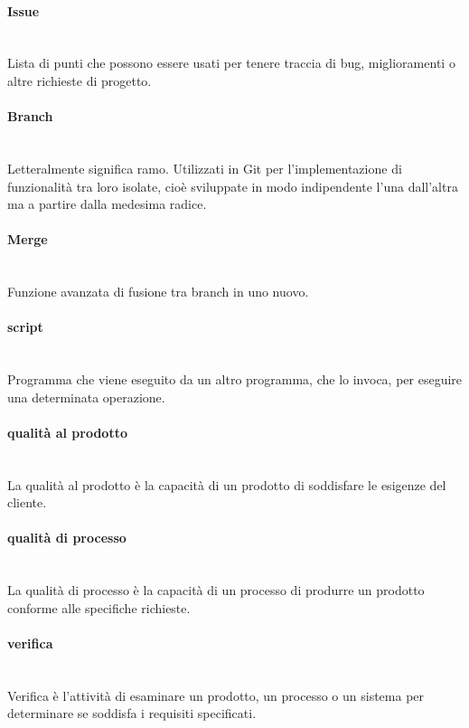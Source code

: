 \paragraph{Issue}~\smallskip \\
Lista di punti che possono essere usati per tenere traccia di bug, miglioramenti o altre richieste di progetto.

\paragraph{Branch}~\smallskip \\
Letteralmente significa ramo. Utilizzati in Git per l'implementazione di funzionalità tra loro isolate, cioè sviluppate in modo indipendente l'una dall'altra ma a partire dalla medesima radice.

\paragraph{Merge}~\smallskip \\
Funzione avanzata di fusione tra branch in uno nuovo.

\paragraph{script}~\smallskip \\
Programma che viene eseguito da un altro programma, che lo invoca, per eseguire una determinata operazione.

\paragraph{qualità al prodotto}~\smallskip \\
La qualità al prodotto è la capacità di un prodotto di soddisfare le esigenze del cliente.

\paragraph{qualità di processo}~\smallskip \\
La qualità di processo è la capacità di un processo di produrre un prodotto conforme alle specifiche richieste.

\paragraph{verifica}~\smallskip \\
Verifica è l'attività di esaminare un prodotto, un processo o un sistema per determinare se soddisfa i requisiti specificati.

